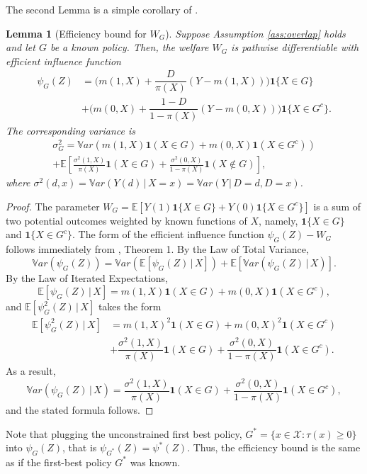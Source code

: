 \documentclass[12pt]{article}
\numberwithin{equation}{section}
\theoremstyle{plain}                         %
\newtheorem{lemma}{Lemma}
\theoremstyle{definition}                  %
\theoremstyle{remark}                      %
\newcommand{\E}{\mathbb{E}}
\newcommand{\Var}{\mathbb{V}ar}
\begin{document}
The second Lemma is a simple corollary of \citet{Hahn98}.
\begin{lemma}[Efficiency bound for $W_G$]
\label{lem:LvdLg}
Suppose Assumption \ref{ass:overlap} holds and let $G$ be a \textit{known} policy. Then, the welfare $W_G$ is pathwise differentiable with efficient influence function 
\begin{align*}
\psi_G(Z) &= \bigg(m(1,X) + \dfrac{D}{\pi(X)} (Y - m(1,X)) \bigg)  \bm{1}\{ X \in G \} \\
&+ \bigg(m(0,X) +  \dfrac{1-D}{1-\pi(X)} (Y - m(0,X)) \bigg) \bm{1}\{ X \in G^c \}. \nonumber
\end{align*}
The corresponding variance  is
\begin{multline} \label{eq:var_bound}
	\sigma^2_G = \Var(m(1, X)\bm{1}(X \in G) + m(0, X) \bm{1}(X \in G^c))\\ + \E\left[\frac{\sigma^2(1, X)}{\pi(X)}\bm{1}(X \in G) + \frac{\sigma^2(0, X)}{1-\pi(X)}\bm{1}(X\notin G)\right],
\end{multline}
where $\sigma^2(d, x) = \Var(Y(d) \,|\,X = x) =\Var(Y \,|\,D = d, D = x)$.
\end{lemma}
\begin{proof}
The parameter $W_G = \E [ Y(1) \bm{1}\{ X \in G \} + Y(0) \bm{1}\{ X \in G^c  \}]$ is a sum of two potential outcomes weighted by known functions of $X$, namely, $\bm{1}\{ X \in G \}$ and $\bm{1}\{ X \in G^c \}$.  The form of the efficient influence function $\psi_G(Z) - W_G$ follows immediately from \citet{Hahn98}, Theorem 1.
	 By the Law of Total Variance,
	\[
	\Var(\psi_G(Z)) = \Var(\E[\psi_G(Z) \,|\,X]) + \E[\Var(\psi_G(Z)\,|\,X)].
	\]
	By the Law of Iterated Expectations,
	\[
	\E[\psi_G(Z)\,|\,X] = m(1, X) \bm{1}(X \in G) + m(0, X) \bm{1}(X \in G^c),
	\]
	and $\E[\psi_G^2(Z) \,|\, X]$ takes the form
	\[
	\begin{array}{cl}
		\E[\psi_G^2(Z) \,|\, X] &= m(1, X)^2 \bm{1}(X \in G) + m(0, X)^2 \bm{1}(X \in G^c)\\[3mm]
		&+ \dfrac{\sigma^2(1, X)}{\pi(X)}\bm{1}(X \in G) + \dfrac{\sigma^2(0, X)}{1-\pi(X)} \bm{1}(X \in G^c).
	\end{array}
	\]
	As a result,
	\[
	\Var(\psi_G(Z) \,|\, X) = \dfrac{\sigma^2(1, X)}{\pi(X)}\bm{1}(X \in G) + \dfrac{\sigma^2(0, X)}{1-\pi(X)} \bm{1}(X \in G^c),
	\]
	and the stated formula follows.
\end{proof}

Note that plugging the unconstrained first best policy, $G^*=\{x \in \mathcal{X}: \tau(x) \geqslant 0\}$ into $\psi_{G}(Z)$, that is $\psi_{G^*}(Z) = \psi^{*}(Z)$. Thus, the efficiency bound is the same as if the first-best policy $G^{*}$ was known. 
\end{document}
